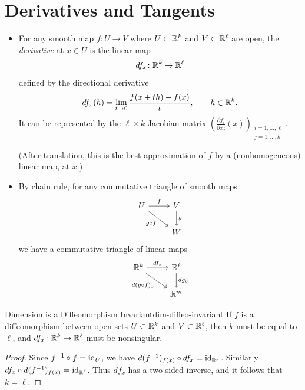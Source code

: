 
\section{Derivatives and Tangents}

\begin{itemize}
    \item For any smooth map $f \colon U \to V$ where $U \subset \mathbb{R}^k$ and $V \subset \mathbb{R}^\ell$ are open, the \emph{derivative} at $x \in U$ is the linear map
    \[
        df_x \colon \mathbb{R}^k \to \mathbb{R}^\ell
    \]
    defined by the directional derivative
    \[
        df_x(h) = \lim_{t \to 0} \frac{f(x + th) - f(x)}{t}, \qquad h \in \mathbb{R}^k.
    \]
    It can be represented by the $\ell \times k$ Jacobian matrix $\left(\frac{\partial f_i}{\partial x_j}(x)\right)_{\substack{i=1,\ldots,\ell \\ j=1,\ldots,k}}$.

    (After translation, this is the best approximation of $f$ by a (nonhomogeneous) linear map, at $x$.)

    \item By chain rule, for any commutative triangle of smooth maps
    \[
    \begin{tikzcd}
        U \arrow[r, "f"] \arrow[dr, "g \circ f"'] & V \arrow[d, "g"] \\
        & W
    \end{tikzcd}
    \]
    we have a commutative triangle of linear maps
    \[
    \begin{tikzcd}
        \R^k \arrow[r, "df_x"] \arrow[dr, "d(g \circ f)_x"'] & \R^\ell \arrow[d, "dg_y"] \\
        & \R^m
    \end{tikzcd}
    \]
\end{itemize}

\begin{theorem}{Dimension is a Diffeomorphism Invariant}{dim-diffeo-invariant}
    If $f$ is a diffeomorphism between open sets $U \subset \mathbb{R}^k$ and $V \subset \mathbb{R}^\ell$, then $k$ must be equal to $\ell$, and $df_x \colon \mathbb{R}^k \to \mathbb{R}^\ell$ must be nonsingular.
\end{theorem}

\begin{proof}
    Since $f^{-1} \circ f = \mathrm{id}_U$, we have $d(f^{-1})_{f(x)} \circ df_x = \mathrm{id}_{\mathbb{R}^k}$. Similarly $df_x \circ d(f^{-1})_{f(x)} = \mathrm{id}_{\mathbb{R}^\ell}$. Thus $df_x$ has a two-sided inverse, and it follows that $k = \ell$.
\end{proof}

